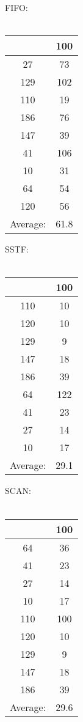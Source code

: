 \documentclass{article}
\begin{document}
\vspace{0.5cm}
\begin{minipage}[t]{0.25\textwidth}
FIFO:\\\\
\begin{tabular}{c|c}
& 100\\
\hline
27 & 73\\
129 & 102\\
110 & 19\\
186 & 76\\
147 & 39\\
41 & 106\\
10 & 31\\
64 & 54\\
120 & 56\\
\hline
Average: & 61.8
\end{tabular}
\end{minipage}
\begin{minipage}[t]{0.25\textwidth}
SSTF:\\\\
\begin{tabular}{c|c}
& 100\\
\hline
110 & 10\\
120 & 10\\
129 & 9\\
147 & 18\\
186 & 39\\
64 & 122\\
41 & 23\\
27 & 14\\
10 & 17\\
\hline
Average: & 29.1
\end{tabular}
\end{minipage}
\begin{minipage}[t]{0.25\textwidth}
SCAN:\\\\
\begin{tabular}{c|c}
& 100\\
\hline
64 & 36\\
41 & 23\\
27 & 14\\
10 & 17\\
110 & 100\\
120 & 10\\
129 & 9\\
147 & 18\\
186 & 39\\
\hline
Average: & 29.6
\end{tabular}
\end{minipage}
\end{document}
